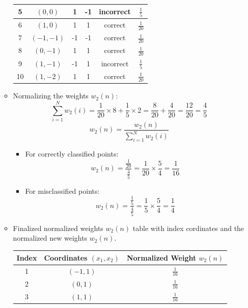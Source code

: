 \documentclass{article}
\begin{document}
\begin{enumerate}[label=\alph*)]
\begin{itemize}
\begin{table}[h!]
\begin{tabular}{|c|c|c|c|c|c|}
         5 & $(0, 0)$ & 1 & -1 & incorrect & \(\frac{1}{5}\) \\
         \hline
         6 & $(1, 0)$ & 1 & 1 & correct & \(\frac{1}{20}\) \\
         \hline
         7 & $(-1, -1)$ & -1 & -1 & correct & \(\frac{1}{20}\) \\
         \hline
         8 & $(0, -1)$ & 1 & 1 & correct & \(\frac{1}{20}\) \\
         \hline
         9 & $(1, -1)$ & -1 & 1 & incorrect & \(\frac{1}{5}\) \\
         \hline
         10 & $(1, -2)$ & 1 & 1 & correct & \(\frac{1}{20}\) \\
         \hline
         \end{tabular}
         \end{table}
         \item Normalizing the weights \(w_2(n)\):
         \[
         \sum_{i=1}^{N} w_2(i) = \frac{1}{20} \times 8 + \frac{1}{5} \times 2 = \frac{8}{20} + \frac{4}{20} = \frac{12}{20} = \frac{4}{5}
         \]
         \[
         w_2(n) = \frac{w_2(n)}{\sum_{i=1}^{N} w_2(i)}
         \]
         \begin{itemize}
            \item For correctly classified points:
            \[
            w_2(n) = \frac{\frac{1}{20}}{\frac{4}{5}} = \frac{1}{20} \times \frac{5}{4} = \frac{1}{16}
            \]
            \item For misclassified points:
            \[
            w_2(n) = \frac{\frac{1}{5}}{\frac{4}{5}} = \frac{1}{5} \times \frac{5}{4} = \frac{1}{4}
            \]
         \end{itemize}
      \item Finalized normalized weights \(w_2(n)\) table with index cordinates and the normalized new weights \(w_2(n)\).
      \begin{table}[h!]
         \centering
         \begin{tabular}{|c|c|c|}
         \hline
         Index & Coordinates $(x_1, x_2)$ & Normalized Weight $w_2(n)$ \\
         \hline
         1 & $(-1, 1)$ & \(\frac{1}{16}\) \\
         \hline
         2 & $(0, 1)$ & \(\frac{1}{16}\) \\
         \hline
         3 & $(1, 1)$ & \(\frac{1}{16}\) \\
         \hline

\end{tabular}
\end{table}
\end{itemize}
\end{enumerate}
\end{document}

